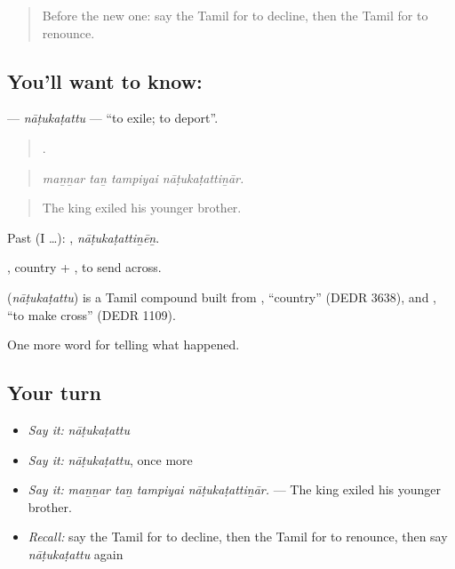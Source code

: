 \label{lesson:TA-C340-natukatattu}



\begin{quote}
Before the new one: say the Tamil for to decline, then the Tamil for to renounce.
\end{quote}

\subsection*{You'll want to know: }
\textbf{} — \emph{nāṭukaṭattu} — \textquotedblleft{}to exile; to deport\textquotedblright{}.

\begin{quote}
   .
\end{quote}

\begin{quote}
\emph{maṉṉar taṉ tampiyai nāṭukaṭattiṉār.}
\end{quote}

\begin{quote}
The king exiled his younger brother.
\end{quote}

Past (I …): , \emph{nāṭukaṭattiṉēṉ}.

, country + , to send across.

\begin{cousinweb}
\textbf{} (\emph{nāṭukaṭattu}) is a Tamil compound built from , \textquotedblleft{}country\textquotedblright{} (DEDR 3638), and , \textquotedblleft{}to make cross\textquotedblright{} (DEDR 1109).
\end{cousinweb}

\begin{grammarlens}[title={What you've built}]
One more word for telling what happened.
\end{grammarlens}

\subsection*{Your turn}
\begin{itemize}
\raggedright
  \item \emph{Say it:} \emph{nāṭukaṭattu}
  \item \emph{Say it:} \emph{nāṭukaṭattu}, once more
  \item \emph{Say it:} \emph{maṉṉar taṉ tampiyai nāṭukaṭattiṉār.} — The king exiled his younger brother.
  \item \emph{Recall:} say the Tamil for to decline, then the Tamil for to renounce, then say \emph{nāṭukaṭattu} again
\end{itemize}

